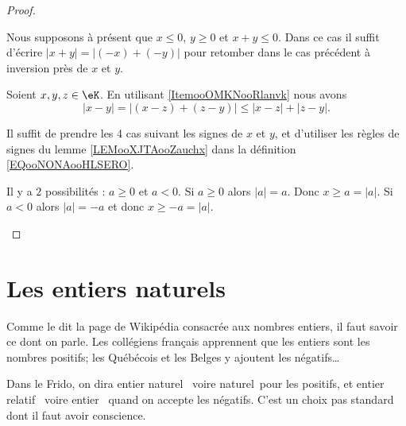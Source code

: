 \begin{proof}
\begin{subproof}
\begin{enumerate}
			      Nous supposons à présent que \( x\leq 0\), \( y\geq 0\) et \( x+y\leq 0\). Dans ce cas il suffit d'écrire \( | x+y |=| (-x)+(-y) |\) pour retomber dans le cas précédent à inversion près de \( x\) et \( y\).
		\end{enumerate}

		Soient \( x,y,z\in \eK\). En utilisant \ref{ItemooOMKNooRlanvk} nous avons
		\begin{equation}
			| x-y |= |  (x-z)+(z-y) |\leq | x-z |+| z-y |.
		\end{equation}

		Il suffit de prendre les 4 cas suivant les signes de \( x\) et \( y\), et d'utiliser les règles de signes du lemme \ref{LEMooXJTAooZauchx} dans la définition \eqref{EQooNONAooHLSERO}.

		Il y a \( 2\) possibilités : \( a\geq 0\) et \( a<0\). Si \( a\geq 0\) alors \( | a |=a\). Donc \( x\geq a=| a |\). Si \( a<0\) alors \( | a |=-a\) et donc \( x\geq -a=| a |\).
	\end{subproof}
\end{proof}


\section{Les entiers naturels}
\label{SECooPJSYooNYaIaq}

\begin{normaltext}	\label{NORMooEntierNaturel}
	Comme le dit la page de Wikipédia consacrée aux nombres entiers, il faut savoir ce dont on parle. Les collégiens français apprennent que les entiers sont les nombres positifs; les Québécois et les Belges y ajoutent les négatifs\dots

	Dans le Frido, on dira \og entier naturel \fg\ voire \og naturel\fg\ pour les positifs, et \og entier relatif \fg\ voire \og entier \fg\ quand on accepte les négatifs. C'est un choix pas standard dont il faut avoir conscience.
\end{normaltext}


